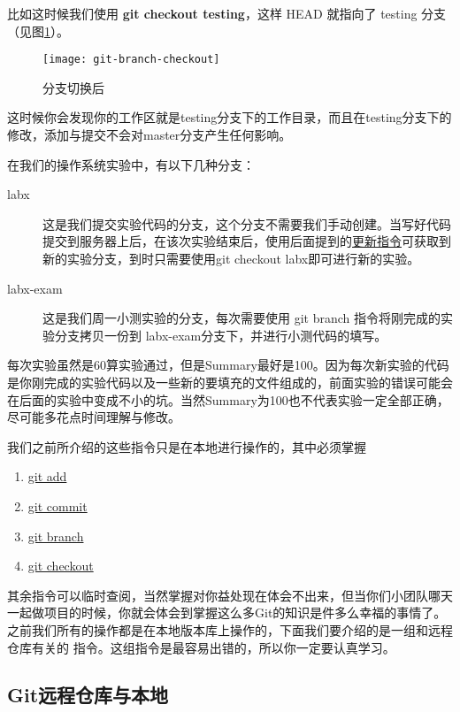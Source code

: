 比如这时候我们使用 \textbf{git checkout testing}，这样 HEAD 就指向了 testing 分支（见图\ref{git-branch-checkout}）。

\begin{figure}[htbp]
  \centering
  \texttt{[image: git-branch-checkout]}
  \caption{分支切换后}\label{git-branch-checkout}
\end{figure}

这时候你会发现你的工作区就是testing分支下的工作目录，而且在testing分支下的修改，添加与提交不会对master分支产生任何影响。

在我们的操作系统实验中，有以下几种分支：
\begin{description}
\item[labx] 这是我们提交实验代码的分支，这个分支不需要我们手动创建。当写好代码提交到服务器上后，在该次实验结束后，使用后面提到的\hyperref[更新指令]{更新指令}可获取到新的实验分支，到时只需要使用git checkout labx即可进行新的实验。
\item[labx-exam] 这是我们周一小测实验的分支，每次需要使用 git branch 指令将刚完成的实验分支拷贝一份到 labx-exam分支下，并进行小测代码的填写。
\end{description}

\begin{note}
每次实验虽然是60算实验通过，但是Summary最好是100。因为每次新实验的代码是你刚完成的实验代码以及一些新的要填充的文件组成的，前面实验的错误可能会在后面的实验中变成不小的坑。当然Summary为100也不代表实验一定全部正确，尽可能多花点时间理解与修改。
\end{note}

我们之前所介绍的这些指令只是在本地进行操作的，其中必须掌握

\begin{enumerate}
  \item \hyperref[git add]{git add}
  \item \hyperref[git commit]{git commit}
  \item \hyperref[git branch]{git branch}
  \item \hyperref[git checkout]{git checkout}
\end{enumerate}

其余指令可以临时查阅，当然掌握对你益处现在体会不出来，但当你们小团队哪天一起做项目的时候，你就会体会到掌握这么多Git的知识是件多么幸福的事情了。之前我们所有的操作都是在本地版本库上操作的，下面我们要介绍的是一组和远程仓库有关的
指令。这组指令是最容易出错的，所以你一定要认真学习。

\subsection{Git远程仓库与本地}

